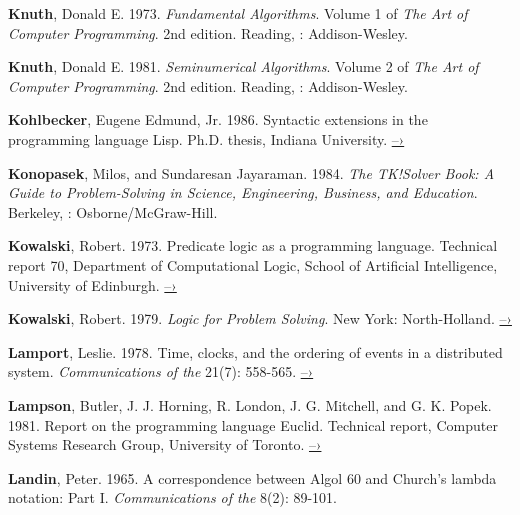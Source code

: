 { \label{Knuth (1973)}
\textbf{Knuth}, Donald E.  1973.  \textit{Fundamental Algorithms}.
Volume 1 of \textit{The
Art of Computer Programming}.  2nd edition. Reading, :
Addison-Wesley.

 \label{Knuth 1981}
\textbf{Knuth}, Donald E.  1981.  \textit{Seminumerical
Algorithms}. Volume 2 of \textit{The
Art of Computer Programming}.  2nd edition. Reading, :
Addison-Wesley.

 \label{Kohlbecker 1986}
\textbf{Kohlbecker}, Eugene Edmund, Jr. 1986.  Syntactic extensions
in the programming
language Lisp.  Ph.D. thesis, Indiana University.
\href{http://www.ccs.neu.edu/scheme/pubs/dissertation-kohlbecker.pdf}{–›}

 \label{Konopasek and Jayaraman 1984}
\textbf{Konopasek}, Milos, and Sundaresan Jayaraman.  1984.
\textit{The TK!Solver Book: A
  Guide to Problem-Solving in Science, Engineering, Business, and
Education}. Berkeley, : Osborne/McGraw-Hill.

 \label{Kowalski (1973; 1979)}
\textbf{Kowalski}, Robert.  1973.  Predicate logic as a programming
language.  Technical
report 70, Department of Computational Logic, School of Artificial
Intelligence, University of Edinburgh.
\href{http://www.doc.ic.ac.uk/~rak/papers/IFIP\%2074.pdf}{–›}

\textbf{Kowalski}, Robert.  1979.  \textit{Logic for Problem
Solving}. New York:
North-Holland.
\href{http://www.doc.ic.ac.uk/\%7Erak/papers/LogicForProblemSolving.pdf}{–›}

 \label{Lamport (1978)}
\textbf{Lamport}, Leslie. 1978.  Time, clocks, and the ordering of events in a
distributed system.  \textit{Communications of the }
21(7): 558-565.
\href{http://research.microsoft.com/en-us/um/people/lamport/pubs/time-clocks.pdf}{–›}

 \label{Lampson et al. 1981}
\textbf{Lampson}, Butler, J. J. Horning, R.  London, J. G.
Mitchell, and G. K.  Popek.
1981.  Report on the programming language Euclid.  Technical report, Computer
Systems Research Group, University of Toronto.
\href{http://www.bitsavers.org/pdf/xerox/parc/techReports/CSL-81-12_Report_On_The_Programming_Language_Euclid.pdf}{–›}

 \label{Landin (1965)}
\textbf{Landin}, Peter.  1965.  A correspondence between Algol 60
and Church's lambda
notation: Part I.  \textit{Communications of the } 8(2): 89-101.

}
